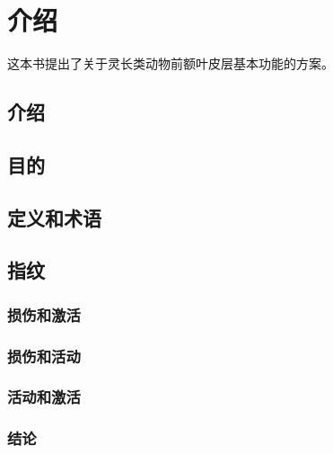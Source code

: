 \chapter{介绍}
这本书提出了关于灵长类动物前额叶皮层基本功能的方案。

\section{介绍}

\section{目的}

\section{定义和术语}


\section{指纹}

\subsection{损伤和激活}

\subsection{损伤和活动}

\subsection{活动和激活}




\subsection{结论}


